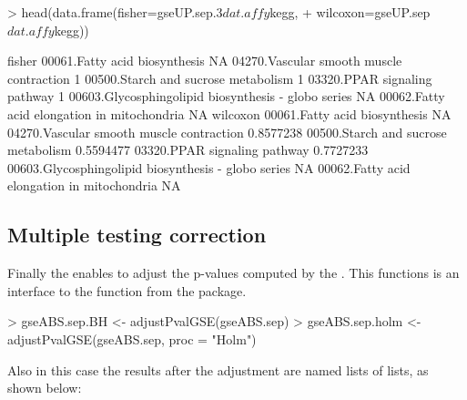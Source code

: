 \documentclass[11pt]{article}
\newcommand{\Rcode}[1]{{\texttt{\color{BrickRed}{#1}}}}
\renewenvironment{Schunk}{\vspace{\topsep}}{\vspace{\topsep}}
\begin{document}
\begin{Schunk}
\begin{Soutput}
\end{Soutput}
\begin{Sinput}
> head(data.frame(fisher=gseUP.sep.3$dat.affy$kegg,
+                 wilcoxon=gseUP.sep$dat.affy$kegg))
\end{Sinput}
\begin{Soutput}
                                                    fisher
00061.Fatty acid biosynthesis                           NA
04270.Vascular smooth muscle contraction                 1
00500.Starch and sucrose metabolism                      1
03320.PPAR signaling pathway                             1
00603.Glycosphingolipid biosynthesis - globo series     NA
00062.Fatty acid elongation in mitochondria             NA
                                                     wilcoxon
00061.Fatty acid biosynthesis                              NA
04270.Vascular smooth muscle contraction            0.8577238
00500.Starch and sucrose metabolism                 0.5594477
03320.PPAR signaling pathway                        0.7727233
00603.Glycosphingolipid biosynthesis - globo series        NA
00062.Fatty acid elongation in mitochondria                NA
\end{Soutput}
\end{Schunk}


\subsection{Multiple testing correction}
Finally the \Rcode{adjustPvalGSE} enables to adjust the
p-values computed by the \Rcode{runBatchGSE}.
This functions is an interface to the \Rcode{mt.rawp2adjp}
function from the \Rcode{multtest} package.

\begin{Schunk}
\begin{Sinput}
> gseABS.sep.BH <- adjustPvalGSE(gseABS.sep)
> gseABS.sep.holm <- adjustPvalGSE(gseABS.sep, proc = "Holm")
\end{Sinput}
\end{Schunk}

Also in this case the results after the adjustment are named lists of lists,
as shown below:
\end{document}
